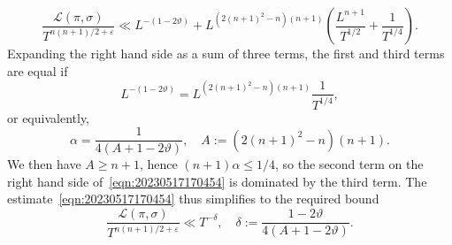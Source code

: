 \documentclass[reqno]{amsart}
\def\eps{\varepsilon}
\theoremstyle{plain} \newtheorem{theorem} {Theorem} \newtheorem{conjecture} {Conjecture} \newtheorem{corollary} [theorem] {Corollary} \newtheorem{proposition} [theorem] {Proposition} \newtheorem{fact} [theorem] {Fact}
\theoremstyle{definition} \newtheorem{definition} [theorem] {Definition}
\theoremstyle{itplain} %
\begin{document}
\begin{equation}\label{eqn:20230517170454}
  \frac{\mathcal{L}(\pi,\sigma)}{ T^{n (n + 1 )/2 + \eps }}
  \ll
  L^{-(1 - 2 \vartheta )} + L^{(2 {(n + 1 )}^2 - n ) (n+1)} \left( \frac{L^{n+1}}{ T^{1/2} }
    + \frac{1}{T^{1/4} }\right).
\end{equation}
Expanding the right hand side as a sum of three terms, the first and third terms are equal if
\begin{equation*}
  L^{- (1 - 2 \vartheta )}
  =
  L^{(2 {(n + 1 )}^2 - n ) (n+1)}
  \frac{1}{T^{1/4} },
\end{equation*}
or equivalently,
\begin{equation*}
  \alpha = \frac{1}{4 ( A + 1 - 2 \vartheta)}, \quad A := (2 {(n + 1 )}^2 - n ) (n + 1).
\end{equation*}
We then have $A \geq n+1$, hence $(n+1) \alpha \leq 1/4$, so the second term on the right hand side of~\eqref{eqn:20230517170454} is dominated by the third term.  The estimate~\eqref{eqn:20230517170454} thus simplifies to the required bound
\begin{equation*}
  \frac{\mathcal{L}(\pi,\sigma)}{ T^{n (n + 1 )/2 + \eps }}
  \ll
  T^{-\delta}, \quad
  \delta := \frac{1 - 2 \vartheta }{4 (A + 1 - 2 \vartheta )}.
\end{equation*}





{} 




\end{document}
